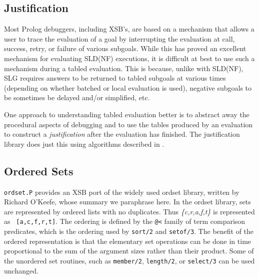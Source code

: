 

\subsection{Justification}

Most Prolog debuggers, including XSB's, are based on a mechanism that
allows a user to trace the evaluation of a goal by interrupting the
evaluation at call, success, retry, or failure of various subgoals.
While this has proved an excellent mechanism for evaluating SLD(NF)
executions, it is difficult at best to use such a mechanism during a
tabled evaluation.  This is because, unlike with SLD(NF), SLG requires
answers to be returned to tabled subgoals at various times (depending
on whether batched or local evaluation is used), negative subgoals to
be sometimes be delayed and/or simplified, etc.

One approach to understanding tabled evaluation better is to abstract
away the procedural aspects of debugging and to use the tables
produced by an evaluation to construct a {\em justification} after the
evaluation has finished.  The justification library does just this
using algorithms described in \cite{GuRR01}.

\subsection{Ordered Sets}

{\tt ordset.P} provides an XSB port of the widely used ordset library,
written by Richard O'Keefe, whose summary we paraphrase here.  In the
ordset library, sets are represented by ordered lists with no
duplicates.  Thus {\em \{c,r,a,f,t\}} is represented as {\tt
[a,c,f,r,t]}.  The ordering is defined by the \verb|@<| family of term
comparison predicates, which is the ordering used by {\tt sort/2} and
{\tt setof/3}.  The benefit of the ordered representation is that the
elementary set operations can be done in time proportional to the sum
of the argument sizes rather than their product.  Some of the
unordered set routines, such as {\tt member/2}, {\tt length/2}, or
{\tt select/3} can be used unchanged.


